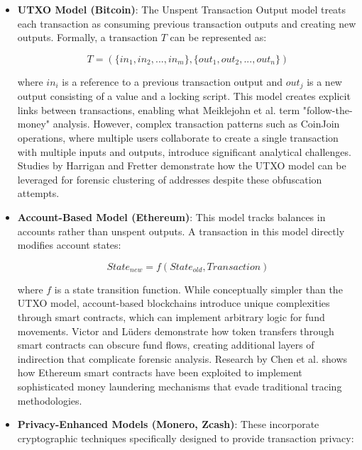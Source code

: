 \documentclass[conference]{IEEEtran}
\begin{document}
\begin{itemize}
    \item \textbf{UTXO Model (Bitcoin)}: The Unspent Transaction Output model treats each transaction as consuming previous transaction outputs and creating new outputs. Formally, a transaction $T$ can be represented as:
    
    \begin{equation}
    T = (\{in_1, in_2, ..., in_m\}, \{out_1, out_2, ..., out_n\})
    \end{equation}
    
    where $in_i$ is a reference to a previous transaction output and $out_j$ is a new output consisting of a value and a locking script. This model creates explicit links between transactions, enabling what Meiklejohn et al. \cite{meiklejohn2013} term "follow-the-money" analysis. However, complex transaction patterns such as CoinJoin operations, where multiple users collaborate to create a single transaction with multiple inputs and outputs, introduce significant analytical challenges. Studies by Harrigan and Fretter \cite{harrigan2016} demonstrate how the UTXO model can be leveraged for forensic clustering of addresses despite these obfuscation attempts.
    
    \item \textbf{Account-Based Model (Ethereum)}: This model tracks balances in accounts rather than unspent outputs. A transaction in this model directly modifies account states:
    
    \begin{equation}
    State_{new} = f(State_{old}, Transaction)
    \end{equation}
    
    where $f$ is a state transition function. While conceptually simpler than the UTXO model, account-based blockchains introduce unique complexities through smart contracts, which can implement arbitrary logic for fund movements. Victor and Lüders \cite{victor2019} demonstrate how token transfers through smart contracts can obscure fund flows, creating additional layers of indirection that complicate forensic analysis. Research by Chen et al. \cite{chen2020} shows how Ethereum smart contracts have been exploited to implement sophisticated money laundering mechanisms that evade traditional tracing methodologies.
    
    \item \textbf{Privacy-Enhanced Models (Monero, Zcash)}: These incorporate cryptographic techniques specifically designed to provide transaction privacy:
    

\end{itemize}
\end{document}
